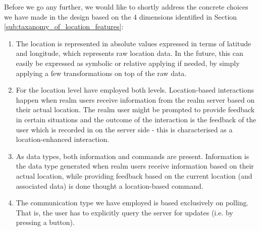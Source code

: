 \noindent Before we go any further, we would like to shortly address the concrete choices we have made in the design based on the 4 dimensions identified in Section \ref{sub:taxanomy_of_location_features}:
\begin{enumerate}
	\item The location is represented in absolute values expressed in terms of latitude and longitude, which represents raw location data. In the future, this can easily be expressed as symbolic or relative applying if needed, by simply applying a few transformations on top of the raw data.
	\item For the location level have employed both levels. Location-based interactions happen when realm users receive information from the realm server based on their actual location. The realm user might be prompted to provide feedback in certain situations and the outcome of the interaction is the feedback of the user which is recorded in on the server side - this is characterised as a location-enhanced interaction.
	\item As data types, both information and commands are present. Information is the data type generated when realm users receive information based on their actual location, while providing feedback based on the current location (and associated data) is done thought a location-based command.
	\item The communication type we have employed is based exclusively on polling. That is, the user has to explicitly query the server for updates (i.e. by pressing a button).
\end{enumerate}

